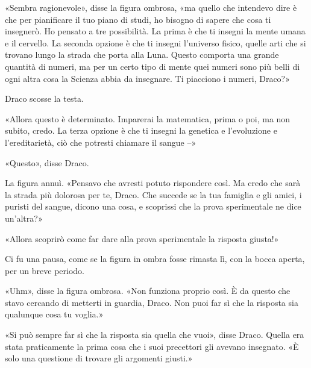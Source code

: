 «Sembra ragionevole», disse la figura ombrosa, «ma quello che intendevo dire è che per pianificare il tuo piano di studi, ho bisogno di sapere che cosa ti insegnerò. Ho pensato a tre possibilità. La prima è che ti insegni la mente umana e il cervello. La seconda opzione è che ti insegni l’universo fisico, quelle arti che si trovano lungo la strada che porta alla Luna. Questo comporta una grande quantità di numeri, ma per un certo tipo di mente quei numeri sono più belli di ogni altra cosa la Scienza abbia da insegnare. Ti piacciono i numeri, Draco?»

Draco scosse la testa.

«Allora questo è determinato. Imparerai la matematica, prima o poi, ma non subito, credo. La terza opzione è che ti insegni la genetica e l’evoluzione e l’ereditarietà, ciò che potresti chiamare il sangue –»

«Questo», disse Draco.

La figura annuì. «Pensavo che avresti potuto rispondere così. Ma credo che sarà la strada più dolorosa per te, Draco. Che succede se la tua famiglia e gli amici, i puristi del sangue, dicono una cosa, e scoprissi che la prova sperimentale ne dice un’altra?»

«Allora scoprirò come far dare alla prova sperimentale la risposta giusta!»

Ci fu una pausa, come se la figura in ombra fosse rimasta lì, con la bocca aperta, per un breve periodo.

«Uhm», disse la figura ombrosa. «Non funziona proprio così. È da questo che stavo cercando di metterti in guardia, Draco. Non puoi far sì che la risposta sia qualunque cosa tu voglia.»

«Si può sempre far sì che la risposta sia quella che vuoi», disse Draco. Quella era stata praticamente la prima cosa che i suoi precettori gli avevano insegnato. «È solo una questione di trovare gli argomenti giusti.»

